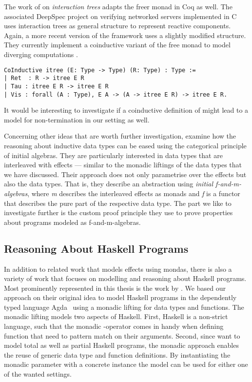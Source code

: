 The work of \citet{koh2019interaction} on \emph{interaction trees} adapts the freer monad in Coq as well.
The associated DeepSpec project on verifying networked servers implemented in C uses interaction trees as general structure to represent reactive components.
Again,  a more recent version of the framework uses a slightly modified structure.
They currently implement a coinductive variant of the free monad to model diverging computations \citep{xia2019interaction}.

\begin{verbatim}
CoInductive itree (E: Type -> Type) (R: Type) : Type :=
| Ret  : R -> itree E R
| Tau : itree E R -> itree E R
| Vis : forall (A : Type), E A -> (A -> itree E R) -> itree E R.
\end{verbatim}

It would be interesting to investigate if a coinductive definition of  might lead to a model for non-termination in our setting as well.

Concerning other ideas that are worth further investigation, \citet{atkey2015interleaving} examine how the reasoning about
inductive data types can be eased using the categorical principle of initial algebras.
They are particularly interested in data types that are interleaved with effects --- similar to the monadic liftings of the data types that we have discussed.
Their approach does not only parametrise over the effects but also the data types.
That is, they describe an abstraction using \emph{initial f-and-m-algebras}, where \emph{m} describes the interleaved effects as monads and \emph{f} is a functor that describes the pure part of the respective data type.
The part we like to investigate further is the custom proof principle they use to prove properties about programs modeled as f-and-m-algebras.

\subsection{Reasoning About Haskell Programs}

In addition to related work that models effects using mondas, there is also a variety of work that focuses on modelling and reasoning about Haskell programs.
Most prominently represented in this thesis is the work by \citet{abel2005verifying}.
We based our approach on their original idea to model Haskell programs in the dependently typed language Agda~\citep{norell2008dependently} using a monadic lifting for data types and functions.
The monadic lifting models two aspects of Haskell.
First, Haskell is a non-strict language, such that the monadic \hinl{>>=}-operator comes in handy when defining function that need to pattern match on their arguments.
Second, since \citeauthor{abel2005verifying} want to model total as well as partial Haskell programs, the monadic approach enables the reuse of generic data type and function definitions.
By instantiating the monadic parameter with a concrete instance the model can be used for either one of the wanted settings.


